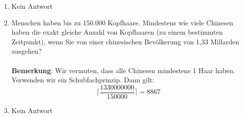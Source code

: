 \begin{enumerate}[label=(\alph*)]
        \item Kein Antwort
        
        \item Menschen haben bis zu 150.000 Kopfhaare. Mindestens wie viele Chinesen haben die
		exakt gleiche Anzahl von Kopfhaaren (zu einem bestimmten Zeitpunkt), wenn Sie von
		einer chinesischen Bevölkerung von 1,33 Millarden ausgehen?\\\\
		\textbf{Bemerkung}: Wir vermuten, dass alle Chinesen mindestens 1 Haar haben.\\
		Verwenden wir ein Schubfachprinzip. Dann gilt:
		\[\bigg\lceil\frac{1330000000}{150000}\bigg\rceil = 8867\]
		
        \item Kein Antwort
    \end{enumerate}
